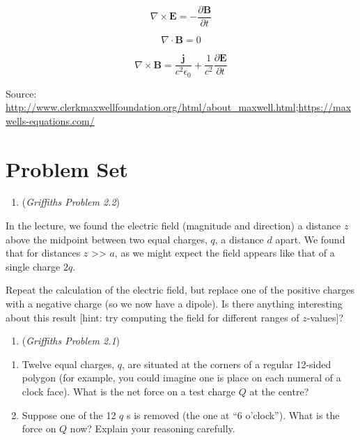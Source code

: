 \documentclass[
  letterpaper,
  DIV=11,
  numbers=noendperiod]{scrreprt}
\providecommand{\tightlist}{%
  \setlength{\itemsep}{0pt}\setlength{\parskip}{0pt}}\usepackage{longtable,booktabs,array}
\begin{document}
\begin{equation}
\nabla \times \mathbf{E} = - \frac{\partial \mathbf{B}}{\partial t} 
\end{equation}

\begin{equation}
\nabla \cdot \mathbf{B} = 0
\end{equation}

\begin{equation}
\nabla \times \mathbf{B} = \frac{\mathbf{j}}{c^2 \epsilon_0} + \frac{1}{c^2} \frac{\partial \mathbf{E}}{\partial t}
\end{equation}

Source:
\url{http://www.clerkmaxwellfoundation.org/html/about_maxwell.html};\url{https://maxwells-equations.com/}

\section{Problem Set}\label{problem-set}

\begin{enumerate}
\def\labelenumi{\arabic{enumi})}
\tightlist
\item
  (\emph{Griffiths Problem 2.2})
\end{enumerate}

In the lecture, we found the electric field (magnitude and direction) a
distance \(z\) above the midpoint between two equal charges, \(q\), a
distance \(d\) apart. We found that for distances \(z\)
\textgreater\textgreater{} \(a\), as we might expect the field appears
like that of a single charge \(2q\).

Repeat the calculation of the electric field, but replace one of the
positive charges with a negative charge (so we now have a dipole). Is
there anything interesting about this result {[}hint: try computing the
field for different ranges of \(z\)-values{]}?

\begin{enumerate}
\def\labelenumi{\arabic{enumi})}
\setcounter{enumi}{1}
\tightlist
\item
  (\emph{Griffiths Problem 2.1})
\end{enumerate}

\begin{enumerate}
\def\labelenumi{(\alph{enumi})}
\item
  Twelve equal charges, \(q\), are situated at the corners of a regular
  12-sided polygon (for example, you could imagine one is place on each
  numeral of a clock face). What is the net force on a test charge \(Q\)
  at the centre?
\item
  Suppose one of the 12 \(q\) s is removed (the one at ``6 o'clock'').
  What is the force on \(Q\) now? Explain your reasoning carefully.
\end{enumerate}
\end{document}
